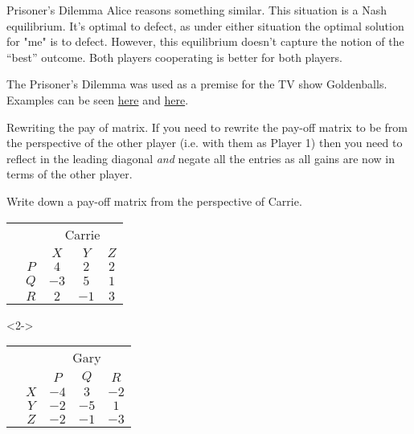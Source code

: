 \documentclass[8pt]{beamer}
\begin{document}
\begin{frame}[shrink=18]{Prisoner's Dilemma}
	Alice reasons something similar. This situation is a Nash equilibrium. It's optimal to defect, as under either situation the optimal solution for "me" is to defect. However, this equilibrium doesn't capture the notion of the “best” outcome. Both players cooperating is better for both players.

	The Prisoner’s Dilemma was used as a premise for the TV show Goldenballs. Examples can be seen \href{https://kingedwardvistratford-my.sharepoint.com/:v:/g/personal/lrackham_kes_net/EX8W1GAF-E1IjdIZ24JMfWsBYTzP8XIlMUIQePewPG3ikw?e=Ln7qWu}{here} and \href{https://kingedwardvistratford-my.sharepoint.com/:v:/g/personal/lrackham_kes_net/Edr36Ri6voxGh8dwagslaisB6ZetaTbMpziX8brToaE3lA?e=qd4jDZ}{here}.
\end{frame}


\begin{frame}[shrink=5]{Rewriting the pay of matrix.}
	If you need to rewrite the pay-off matrix to be from the perspective of the other player (i.e. with them as Player 1) then you need to reflect in the leading diagonal \emph{and} negate all the entries as all gains are now in terms of the other player.
	\begin{problem}
		Write down a pay-off matrix from the perspective of Carrie.

		\begin{center}
\colorbox{cc}{
	\setlength\arrayrulewidth{0.5mm}
\begin{tabular}{cc|ccc}
	\multicolumn{2}{c}{} & \multicolumn{3}{c}{Carrie}\\
\multicolumn{1}{c}{} &  & $X$  & $Y$ & $Z$ \\ \hline
\raisebox{0.0cm}{\multirow{3}*{\rotatebox{90}{Gary}}}  & $P$ & $4$ & $2$ & $2$ \\
& $Q$ & $-3$ & $5$ & $1$ \\
& $R$ & $2$ & $-1$ & $3$ \\
\end{tabular}}
\end{center}
\end{problem}

	\begin{solution}<2->
		\begin{center}
\colorbox{cc}{
	\setlength\arrayrulewidth{0.5mm}
\begin{tabular}{cc|ccc}
	\multicolumn{2}{c}{} & \multicolumn{3}{c}{Gary}\\
\multicolumn{1}{c}{} &  & $P$  & $Q$ & $R$ \\ \hline
\raisebox{0.0cm}{\multirow{3}*{\rotatebox{90}{Carrie}}}  & $X$ & $-4$ & $3$ & $-2$ \\
& $Y$ & $-2$ & $-5$ & $1$ \\
& $Z$ & $-2$ & $-1$ & $-3$ \\
\end{tabular}}
\end{center}

\end{solution}
\end{frame}
\end{document}
